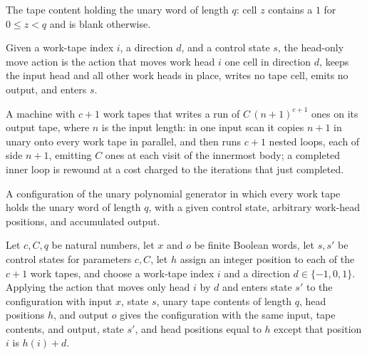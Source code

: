 \begin{definition}
\label{Turing.FinTM.catalogPolyTape}
\leanok
The tape content holding the unary word of length $q$: cell $z$ contains a $1$
for $0 \le z < q$ and is blank otherwise.
\end{definition}

\begin{definition}
\label{Turing.FinTM.catalogPolyMove}
\leanok
{}
Given a work-tape index $i$, a direction $d$, and a control state $s$, the
head-only move action is the action that moves work head $i$ one cell in
direction $d$, keeps the input head and all other work heads in place,
writes no tape cell, emits no output, and enters $s$.
\end{definition}

\begin{definition}
\label{Turing.FinTM.catalogPolyUnaryTM}
\leanok
{}
A machine with $c+1$ work tapes that writes a run of $C\,(n+1)^{c+1}$ ones on
its output tape, where $n$ is the input length: in one input scan it copies
$n+1$ in unary onto every work tape in parallel, and then runs $c+1$ nested
loops, each of side $n+1$, emitting $C$ ones at each visit of the innermost
body; a completed inner loop is rewound at a cost charged to the iterations
that just completed.
\end{definition}

\begin{definition}
\label{Turing.FinTM.catalogPolyCfg}
\leanok
{}
A configuration of the unary polynomial generator in which every work tape
holds the unary word of length $q$, with a given control state, arbitrary
work-head positions, and accumulated output.
\end{definition}

\begin{lemma}
\label{Turing.FinTM.catalogPolyMove_apply}
\leanok
{}
Let $c,C,q$ be natural numbers, let $x$ and $o$ be finite Boolean words, let $s,s'$ be
control states for parameters $c,C$, let $h$ assign an integer position to each of the
$c+1$ work tapes, and choose a work-tape index $i$ and a direction $d\in\{-1,0,1\}$.
Applying the action that moves only head $i$ by $d$ and enters state $s'$ to the
configuration with input $x$, state $s$, unary tape contents of length $q$, head
positions $h$, and output $o$ gives the configuration with the same input, tape
contents, and output, state $s'$, and head positions equal to $h$ except that position
$i$ is $h(i)+d$.
\end{lemma}

